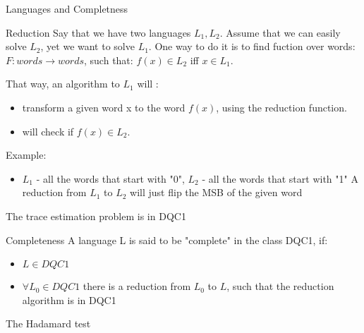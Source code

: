 \documentclass[leqno,fleqn]{beamer}
\begin{document}
\begin{frame}[label=sec-1-4]{Languages and Completness}
\begin{block}{Reduction}
Say that we have two languages \(L_{1}, L_{2}\). Assume that we can easily
solve \(L_{2}\), yet we want to solve \(L_{1}\). One way to do it is to find
fuction over words: \(F:{words} \rightarrow {words}\), such that:
\(f(x) \in L_{2}\) iff \(x \in L_{1}\).

That way, an algorithm to \(L_{1}\) will :

\begin{itemize}
\item transform a given word x to the word \(f(x)\), using the reduction
function.

\item will check if \(f(x) \in L_{2}\).
\end{itemize}

Example:

\begin{itemize}
\item \(L_{1}\) - all the words that start with "0", \(L_{2}\) - all the words
that start with "1" A reduction from \(L_{1}\) to \(L_{2}\) will just
flip the MSB of the given word
\end{itemize}
\end{block}
\end{frame}
\begin{frame}[label=sec-1-5]{The trace estimation problem is in DQC1}
\begin{block}{Completeness}
A language L is said to be "complete" in the class DQC1, if:
\begin{itemize}
\item \(L \in DQC1\)
\item \(\forall L_{0} \in DQC1\) there is a reduction from \(L_{0}\) to \(L\), such that the reduction algorithm is in DQC1
\end{itemize}
\end{block}
\end{frame}
\begin{frame}[label=sec-1-6]{The Hadamard test}
\end{frame}
\end{document}
